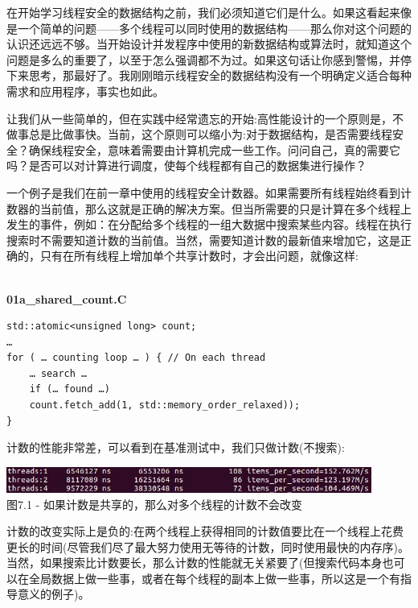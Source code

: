 
在开始学习线程安全的数据结构之前，我们必须知道它们是什么。如果这看起来像是一个简单的问题——多个线程可以同时使用的数据结构——那么你对这个问题的认识还远远不够。当开始设计并发程序中使用的新数据结构或算法时，就知道这个问题是多么的重要了，以至于怎么强调都不为过。如果这句话让你感到警惕，并停下来思考，那最好了。我刚刚暗示线程安全的数据结构没有一个明确定义适合每种需求和应用程序，事实也如此。


让我们从一些简单的，但在实践中经常遗忘的开始:高性能设计的一个原则是，不做事总是比做事快。当前，这个原则可以缩小为:对于数据结构，是否需要线程安全？确保线程安全，意味着需要由计算机完成一些工作。问问自己，真的需要它吗？是否可以对计算进行调度，使每个线程都有自己的数据集进行操作？

一个例子是我们在前一章中使用的线程安全计数器。如果需要所有线程始终看到计数器的当前值，那么这就是正确的解决方案。但当所需要的只是计算在多个线程上发生的事件，例如：在分配给多个线程的一组大数据中搜索某些内容。线程在执行搜索时不需要知道计数的当前值。当然，需要知道计数的最新值来增加它，这是正确的，只有在所有线程上增加单个共享计数时，才会出问题，就像这样:

\hspace*{\fill} \\ %
\noindent
\textbf{01a\_shared\_count.C}
\begin{lstlisting}[style=styleCXX]
std::atomic<unsigned long> count;
…
for ( … counting loop … ) { // On each thread
	… search …
	if (… found …)
	count.fetch_add(1, std::memory_order_relaxed));
}
\end{lstlisting}

计数的性能非常差，可以看到在基准测试中，我们只做计数(不搜索):

\begin{center}
\includegraphics[width=0.9\textwidth]{content/2/chapter7/images/1.jpg}\\
图7.1 - 如果计数是共享的，那么对多个线程的计数不会改变
\end{center}

计数的改变实际上是负的:在两个线程上获得相同的计数值要比在一个线程上花费更长的时间(尽管我们尽了最大努力使用无等待的计数，同时使用最快的内存序)。当然，如果搜索比计数要长，那么计数的性能就无关紧要了(但搜索代码本身也可以在全局数据上做一些事，或者在每个线程的副本上做一些事，所以这是一个有指导意义的例子)。

